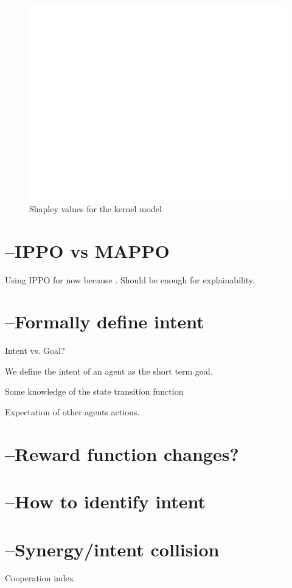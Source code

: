 \documentclass[UKenglish]{uiomasterthesis}
\begin{document}
\begin{figure}[!ht]
	\includegraphics[width=\columnwidth]{images/shap_plot_kernel.pdf}
	\caption{Shapley values for the kernel model}
	\label{fig:shap} 
\end{figure}
\section{--IPPO vs MAPPO}
Using IPPO for now because \cite{dewitt2020independentlearningneedstarcraft}. Should be enough for explainability.

\section{--Formally define intent}
Intent vs. Goal?

We define the intent of an agent as the short term goal.

Some knowledge of the state transition function

Expectation of other agents actions.


\section{--Reward function changes?}

\section{--How to identify intent}

\section{--Synergy/intent collision}
Cooperation index
\end{document}
